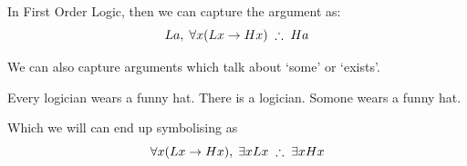 In First Order Logic, then we can capture the argument as:
$$La,\;\forall x(Lx\eif Hx)\;\therefore\; Ha$$

We can also capture arguments which talk about `some' or `exists'. 
\begin{earg}
	\prem Every logician wears a funny hat.
	\prem There is a logician.
	\conc Somone wears a funny hat.
\end{earg}
Which we will can end up symbolising as 
$$\forall x(Lx\eif Hx),\; \exists x Lx\;\therefore\; \exists x Hx$$


%
%
%
%
%
